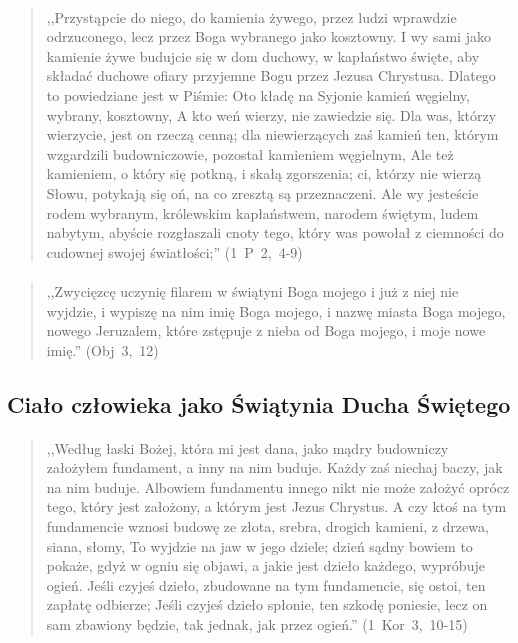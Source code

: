 \documentclass[10pt,a4paper,oneside]{article}
\begin{document}
\paragraph{}
\begin{quote}
,,Przystąpcie do niego, do kamienia żywego, przez ludzi wprawdzie odrzuconego, lecz przez Boga wybranego jako kosztowny. I wy sami jako kamienie żywe budujcie się w dom duchowy, w kapłaństwo święte, aby składać duchowe ofiary przyjemne Bogu przez Jezusa Chrystusa. Dlatego to powiedziane jest w Piśmie: Oto kładę na Syjonie kamień węgielny, wybrany, kosztowny, A kto weń wierzy, nie zawiedzie się. Dla was, którzy wierzycie, jest on rzeczą cenną; dla niewierzących zaś kamień ten, którym wzgardzili budowniczowie, pozostał kamieniem węgielnym, Ale też kamieniem, o który się potkną, i skałą zgorszenia; ci, którzy nie wierzą Słowu, potykają się oń, na co zresztą są przeznaczeni. Ale wy jesteście rodem wybranym, królewskim kapłaństwem, narodem świętym, ludem nabytym, abyście rozgłaszali cnoty tego, który was powołał z ciemności do cudownej swojej światłości;'' \mbox{(1 P 2, 4-9)}
\end{quote}
\paragraph{}
\begin{quote}
,,Zwycięzcę uczynię filarem w świątyni Boga mojego i już z niej nie wyjdzie, i wypiszę na nim imię Boga mojego, i nazwę miasta Boga mojego, nowego Jeruzalem, które zstępuje z nieba od Boga mojego, i moje nowe imię.'' \mbox{(Obj 3, 12)}
\end{quote}
\subsection{Ciało człowieka jako Świątynia Ducha Świętego}
\paragraph{}
\begin{quote}
,,Według łaski Bożej, która mi jest dana, jako mądry budowniczy założyłem fundament, a inny na nim buduje. Każdy zaś niechaj baczy, jak na nim buduje. Albowiem fundamentu innego nikt nie może założyć oprócz tego, który jest założony, a którym jest Jezus Chrystus. A czy ktoś na tym fundamencie wznosi budowę ze złota, srebra, drogich kamieni, z drzewa, siana, słomy, To wyjdzie na jaw w jego dziele; dzień sądny bowiem to pokaże, gdyż w ogniu się objawi, a jakie jest dzieło każdego, wypróbuje ogień. Jeśli czyjeś dzieło, zbudowane na tym fundamencie, się ostoi, ten zapłatę odbierze; Jeśli czyjeś dzieło spłonie, ten szkodę poniesie, lecz on sam zbawiony będzie, tak jednak, jak przez ogień.'' \mbox{(1 Kor 3, 10-15)}
\end{quote}
\end{document}
